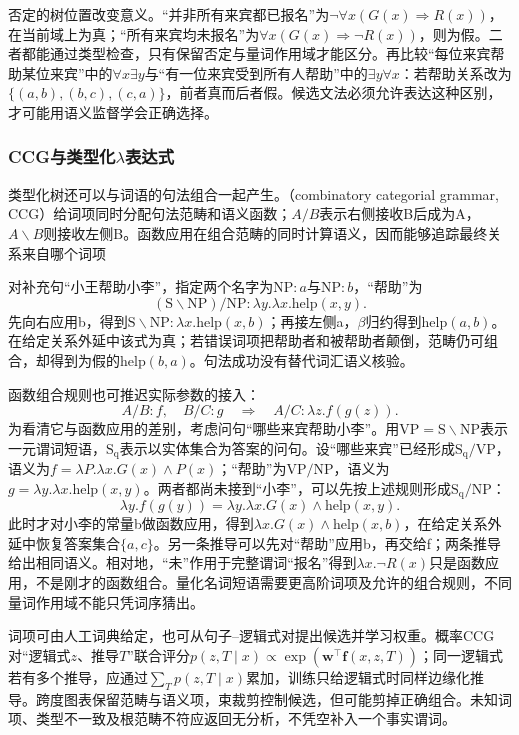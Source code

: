 否定的树位置改变意义。“并非所有来宾都已报名”为$\neg\forall x(G(x)\Rightarrow R(x))$，在当前域上为真；“所有来宾均未报名”为$\forall x(G(x)\Rightarrow\neg R(x))$，则为假。二者都能通过类型检查，只有保留否定与量词作用域才能区分。再比较“每位来宾帮助某位来宾”中的$\forall x\exists y$与“有一位来宾受到所有人帮助”中的$\exists y\forall x$：若帮助关系改为$\{(a,b),(b,c),(c,a)\}$，前者真而后者假。候选文法必须允许表达这种区别，才可能用语义监督学会正确选择。

\subsubsection{CCG与类型化\texorpdfstring{$\lambda$}{lambda}表达式}
\label{sec:nlp-analysis-ccg}

类型化树还可以与词语的句法组合一起产生。（combinatory categorial grammar, CCG）给词项同时分配句法范畴和语义函数；$A/B$表示右侧接收B后成为A，$A\backslash B$则接收左侧B。函数应用在组合范畴的同时计算语义，因而能够追踪最终关系来自哪个词项

对补充句“小王帮助小李”，指定两个名字为$\mathrm{NP}:a$与$\mathrm{NP}:b$，“帮助”为
\[
 (\mathrm S\backslash\mathrm{NP})/\mathrm{NP}
 :\lambda y.\lambda x.\mathrm{help}(x,y).
\]
先向右应用b，得到$\mathrm S\backslash\mathrm{NP}:
\lambda x.\mathrm{help}(x,b)$；再接左侧a，$\beta$归约得到$\mathrm{help}(a,b)$。在给定关系外延中该式为真；若错误词项把帮助者和被帮助者颠倒，范畴仍可组合，却得到为假的$\mathrm{help}(b,a)$。句法成功没有替代词汇语义核验。

函数组合规则也可推迟实际参数的接入：
\[
 A/B:f,\quad B/C:g
 \quad\Longrightarrow\quad A/C:\lambda z.f(g(z)).
\]
为看清它与函数应用的差别，考虑问句“哪些来宾帮助小李”。用$\mathrm{VP}=\mathrm S\backslash\mathrm{NP}$表示一元谓词短语，$\mathrm{S_q}$表示以实体集合为答案的问句。设“哪些来宾”已经形成$\mathrm{S_q}/\mathrm{VP}$，语义为$f=\lambda P.\lambda x.G(x)\land P(x)$；“帮助”为$\mathrm{VP}/\mathrm{NP}$，语义为$g=\lambda y.\lambda x.\mathrm{help}(x,y)$。两者都尚未接到“小李”，可以先按上述规则形成$\mathrm{S_q}/\mathrm{NP}$：
\[
 \lambda y.f(g(y))
 =\lambda y.\lambda x.G(x)\land\mathrm{help}(x,y).
\]
此时才对小李的常量b做函数应用，得到$\lambda x.G(x)\land\mathrm{help}(x,b)$，在给定关系外延中恢复答案集合$\{a,c\}$。另一条推导可以先对“帮助”应用b，再交给f；两条推导给出相同语义。相对地，“未”作用于完整谓词“报名”得到$\lambda x.\neg R(x)$只是函数应用，不是刚才的函数组合。量化名词短语需要更高阶词项及允许的组合规则，不同量词作用域不能只凭词序猜出。

词项可由人工词典给定，也可从句子--逻辑式对提出候选并学习权重。概率CCG对“逻辑式$z$、推导$T$”联合评分$p(z,T\mid x)\propto\exp(\bm w^\top\bm f(x,z,T))$；同一逻辑式若有多个推导，应通过$\sum_Tp(z,T\mid x)$累加，训练只给逻辑式时同样边缘化推导。跨度图表保留范畴与语义项，束裁剪控制候选，但可能剪掉正确组合。未知词项、类型不一致及根范畴不符应返回无分析，不凭空补入一个事实谓词。

